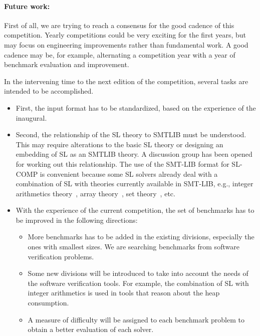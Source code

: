\documentclass{llncs}
\begin{document}
\paragraph{Future work:}
First of all, we are trying to reach a consensus for the good cadence of this competition. Yearly competitions could be very exciting for the first years, but may focus on engineering improvements rather than fundamental work. 
A good cadence may be, for example, alternating a competition year with a year of benchmark evaluation and improvement.

In the intervening time to the next edition of the competition, several tasks are intended to be accomplished.
\begin{itemize}
\item First, the input format has to be standardized, based on the experience of the inaugural. 

\item Second, the relationship of the SL theory to SMTLIB must be understood. This may require alterations to
the basic SL theory or designing an embedding of SL as an SMTLIB theory.
A discussion group has been opened for working out this relationship. 
The use of the SMT-LIB format for SL-COMP is convenient because some SL solvers already deal with a combination of SL with theories currently available in SMT-LIB, e.g., 
integer arithmetics theory~\cite{PerezR11}, array theory~\cite{BouajjaniDES12-vmcai}, set theory~\cite{PiskacWZ13}, etc.


\item With the experience of the current competition, the set of benchmarks has to be improved in the following directions:
\begin{itemize}
\item More benchmarks has to be added in the existing divisions, especially the ones with smallest sizes. 
We are searching benchmarks from software verification problems.

\item Some new divisions will be introduced to take into account the needs of the software verification tools. For example, the combination of SL with integer arithmetics is used in tools that reason about the heap consumption.

\item A measure of difficulty will be assigned to each benchmark problem to obtain a better evaluation of each solver.
\end{itemize}


\end{itemize}
\end{document}
